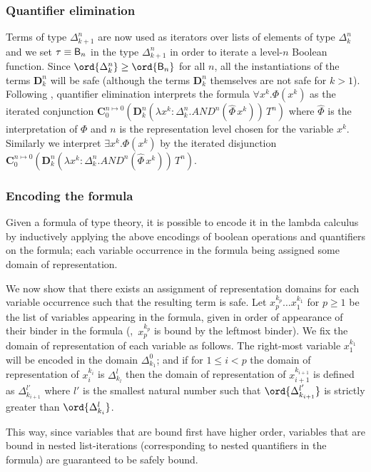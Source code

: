 \subsubsection{Quantifier elimination}
Terms of type $\Delta_{k+1}^n$ are now used as iterators over lists of elements of type $\Delta_k^n$ and we set $\tau \equiv \mathsf{B}_n$ in the type $\Delta_{k+1}^n$ in order to iterate a level-$n$ Boolean function. Since $\ord{\Delta_k^n} \geq \ord{\booltype_n}$ for all $n$, all the instantiations of the terms $\mathbf{D}_k^n$ will be safe
 (although the terms $\mathbf{D}_k^n$ themselves are not safe for $k>1$).
 Following \cite{mairson1992spt}, quantifier elimination interprets the formula $\forall x^k.\Phi(x^k)$ as the iterated conjunction
$\mathbf{C}_0^{n\mapsto 0} \left( \mathbf{D}_k^n(\lambda x^k:\Delta_k^n.AND^n(\hat\Phi\,x^k))\,T^n \right)$ where $\hat\Phi$ is the interpretation of $\Phi$
and $n$ is the representation level chosen for the variable $x^k$. Similarly we interpret $\exists x^k.\Phi(x^k)$  by the iterated disjunction $\mathbf{C}_0^{n\mapsto 0} \left( \mathbf{D}_k^n(\lambda x^k:\Delta_k^n.AND^n(\hat\Phi\,x^k))\,T^n\right)$.

\subsubsection{Encoding the formula}

Given a formula of type theory, it is possible to encode it in the lambda calculus by inductively applying the above encodings of boolean operations and quantifiers on the formula; each variable occurrence in the formula being assigned some domain of representation.

We now show that there exists an assignment of representation domains for each variable occurrence such that the resulting term is safe. Let $x^{k_p}_p \ldots x^{k_1}_1$ for $p\geq1$ be the list of variables appearing in the formula, given in order of appearance of their binder in the formula (\ie,~$x^{k_p}_p$ is bound by the leftmost binder). We fix the domain of representation of each variable as follows. The right-most variable $x^{k_1}_1$ will be encoded in the domain $\Delta^0_{k_1}$; and if for $1\leq i< p$ the domain of representation of $x^{k_i}_i$ is $\Delta^l_{k_l}$ then the domain of representation of $x^{k_{i+1}}_{i+1}$ is defined as
$\Delta^{l'}_{k_{i+1}}$ where $l'$ is the smallest natural number such that $\ord{\Delta^{l'}_{k_{i+1}}}$ is strictly greater than $\ord{\Delta^{l}_{k_i}}$.

This way, since variables that are bound first have higher order, variables that are bound in  nested list-iterations (corresponding to nested quantifiers in the formula) are guaranteed to be safely bound.

